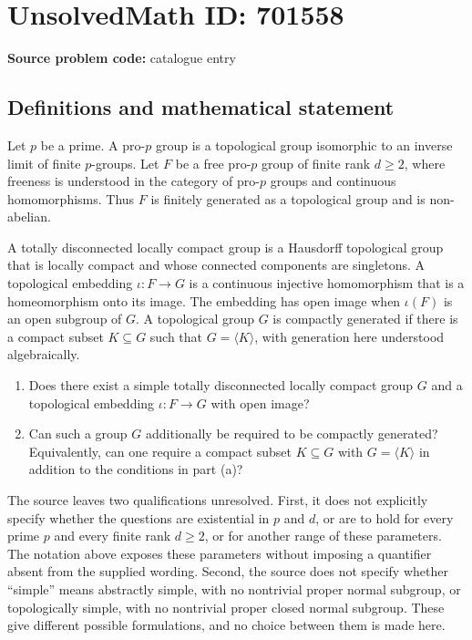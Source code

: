 \documentclass[11pt]{article}
\begin{document}
\section*{UnsolvedMath ID: 701558}
\textbf{Source problem code:} catalogue entry
\subsection{Definitions and mathematical statement}
Let \(p\) be a prime. A pro-\(p\) group is a topological group isomorphic to an inverse limit of finite \(p\)-groups. Let \(F\) be a free pro-\(p\) group of finite rank \(d\geq 2\), where freeness is understood in the category of pro-\(p\) groups and continuous homomorphisms. Thus \(F\) is finitely generated as a topological group and is non-abelian.

A totally disconnected locally compact group is a Hausdorff topological group that is locally compact and whose connected components are singletons. A topological embedding \(\iota:F\to G\) is a continuous injective homomorphism that is a homeomorphism onto its image. The embedding has open image when \(\iota(F)\) is an open subgroup of \(G\). A topological group \(G\) is compactly generated if there is a compact subset \(K\subseteq G\) such that \(G=\langle K\rangle\), with generation here understood algebraically.

\begin{enumerate}
\item[(a)] Does there exist a simple totally disconnected locally compact group \(G\) and a topological embedding \(\iota:F\to G\) with open image?
\item[(b)] Can such a group \(G\) additionally be required to be compactly generated? Equivalently, can one require a compact subset \(K\subseteq G\) with \(G=\langle K\rangle\) in addition to the conditions in part (a)?
\end{enumerate}

The source leaves two qualifications unresolved. First, it does not explicitly specify whether the questions are existential in \(p\) and \(d\), or are to hold for every prime \(p\) and every finite rank \(d\geq2\), or for another range of these parameters. The notation above exposes these parameters without imposing a quantifier absent from the supplied wording. Second, the source does not specify whether ``simple'' means abstractly simple, with no nontrivial proper normal subgroup, or topologically simple, with no nontrivial proper closed normal subgroup. These give different possible formulations, and no choice between them is made here.
\end{document}
